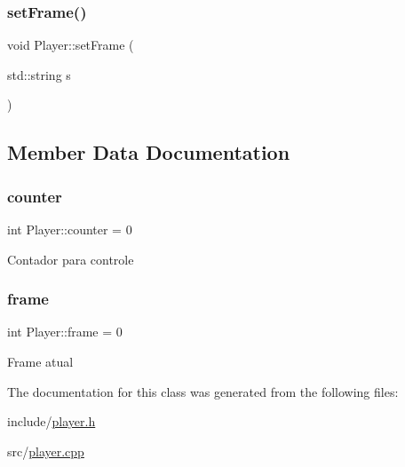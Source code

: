 \mbox{\label{classPlayer_a0b5112993f246d3c0a848f3eab8db3a8}} 
\subsubsection{\texorpdfstring{set\+Frame()}{setFrame()}}
{\footnotesize\ttfamily void Player\+::set\+Frame (\begin{DoxyParamCaption}\item[{std\+::string}]{s }\end{DoxyParamCaption})}



\subsection{Member Data Documentation}
\mbox{\label{classPlayer_a03eea1e12f10153b96d2c79f906fcc14}} 
\subsubsection{\texorpdfstring{counter}{counter}}
{\footnotesize\ttfamily int Player\+::counter = 0}

Contador para controle \mbox{\label{classPlayer_a4af20962be9096bdc5571ee9f9bf3a29}} 
\subsubsection{\texorpdfstring{frame}{frame}}
{\footnotesize\ttfamily int Player\+::frame = 0}

Frame atual 

The documentation for this class was generated from the following files\+:\begin{DoxyCompactItemize}
\item 
include/\hyperlink{player_8h}{player.\+h}\item 
src/\hyperlink{player_8cpp}{player.\+cpp}\end{DoxyCompactItemize}
